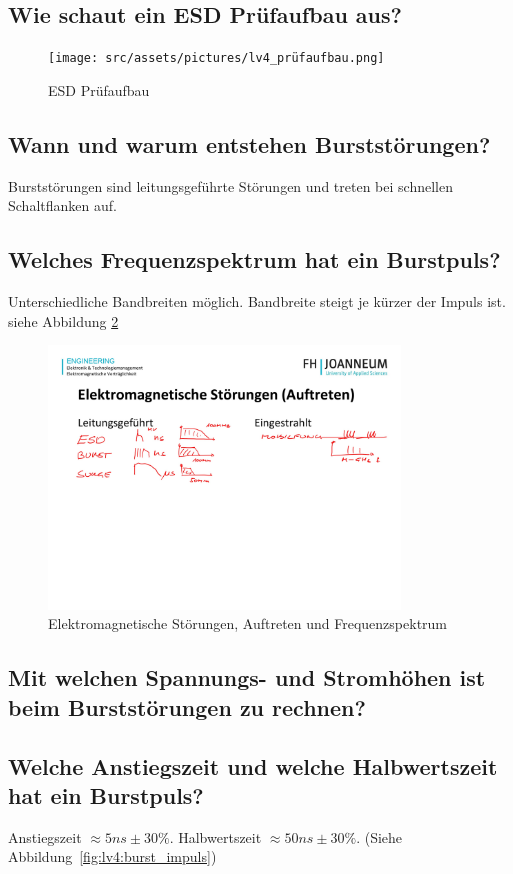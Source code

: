 \subsection{Wie schaut ein ESD Prüfaufbau aus?}
\begin{figure}[!ht]
  \centering
  \texttt{[image: src/assets/pictures/lv4\_prüfaufbau.png]}
  \caption{ESD Prüfaufbau}\label{fig:lv4:esd_test}
\end{figure}

\subsection{Wann und warum entstehen Burststörungen?}
Burststörungen sind leitungsgeführte Störungen und treten bei schnellen Schaltflanken auf. 

\subsection{Welches Frequenzspektrum hat ein Burstpuls?}
Unterschiedliche Bandbreiten möglich. Bandbreite steigt je kürzer der Impuls ist.\\
siehe Abbildung \ref{fig:lv4:electro_interferences}
\begin{figure}[ht]
  \centering
  \includegraphics[height=7cm]{src/assets/pictures/lv4_elektromagnetische_stoerungen.jpg}
  \caption{Elektromagnetische Störungen, Auftreten und Frequenzspektrum}\label{fig:lv4:electro_interferences}
\end{figure}

\subsection{Mit welchen Spannungs- und Stromhöhen ist beim Burststörungen zu rechnen?}

\subsection{Welche Anstiegszeit und welche Halbwertszeit hat ein Burstpuls?}
Anstiegszeit \(\approx 5ns \pm 30\%\). Halbwertszeit \(\approx 50ns \pm 30\%\). (Siehe Abbildung~\ref{fig:lv4:burst_impuls})

